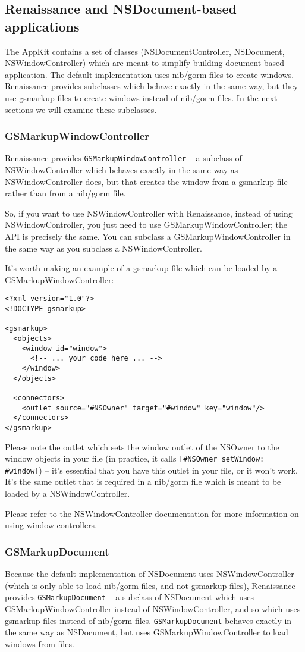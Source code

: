 \subsection{Renaissance and NSDocument-based applications}
The AppKit contains a set of classes (NSDocumentController,
NSDocument, NSWindowController) which are meant to simplify building
document-based application.  The default implementation uses nib/gorm
files to create windows.  Renaissance provides subclasses which behave
exactly in the same way, but they use gsmarkup files to create windows
instead of nib/gorm files.  In the next sections we will examine these
subclasses.

\subsubsection{GSMarkupWindowController}
Renaissance provides \texttt{GSMarkupWindowController} -- a subclass
of NSWindowController which behaves exactly in the same way as
NSWindowController does, but that creates the window from a gsmarkup
file rather than from a nib/gorm file.

So, if you want to use NSWindowController with Renaissance, instead of
using NSWindowController, you just need to use
GSMarkupWindowController; the API is precisely the same.  You can
subclass a GSMarkupWindowController in the same way as you subclass a
NSWindowController.

It's worth making an example of a gsmarkup file which can be loaded by 
a GSMarkupWindowController:
\begin{verbatim}
<?xml version="1.0"?>
<!DOCTYPE gsmarkup>

<gsmarkup>
  <objects>
    <window id="window">
      <!-- ... your code here ... -->
    </window>
  </objects>

  <connectors>
    <outlet source="#NSOwner" target="#window" key="window"/>
  </connectors>
</gsmarkup>
\end{verbatim}
Please note the outlet which sets the window outlet of the NSOwner to
the window objects in your file (in practice, it calls
\texttt{[\#NSOwner setWindow: \#window]}) -- it's essential that you have
this outlet in your file, or it won't work.  It's the same outlet that
is required in a nib/gorm file which is meant to be loaded by a 
NSWindowController.

Please refer to the NSWindowController documentation for more information
on using window controllers.

\subsubsection{GSMarkupDocument}
Because the default implementation of NSDocument uses
NSWindowController (which is only able to load nib/gorm files, and not
gsmarkup files), Renaissance provides \texttt{GSMarkupDocument} -- a
subclass of NSDocument which uses GSMarkupWindowController instead of
NSWindowController, and so which uses gsmarkup files instead of
nib/gorm files.  \texttt{GSMarkupDocument} behaves exactly in the same
way as NSDocument, but uses GSMarkupWindowController to load windows
from files.

